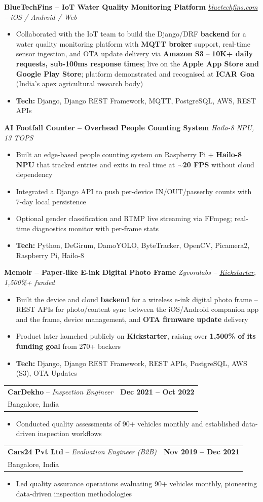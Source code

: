 \documentclass[letterpaper,10.5pt]{article}
\makeatletter
\newcommand{\resumeItem}[1]{
  \item\small{#1\vspace{1pt}}
}
\newcommand{\resumeRole}[4]{
  \vspace{-1pt}\item[]
    \begin{tabular*}{\textwidth}{l@{\extracolsep{\fill}}r}
      \textbf{#1} -- \textit{#3} & \textbf{#2}\\
      \small #4 &  \\
    \end{tabular*}\vspace{-4pt}
}
\newcommand{\bulletListStart}{\begin{itemize}[leftmargin=0.2in, itemsep=0pt, topsep=1pt]}
\newcommand{\bulletListEnd}{\end{itemize}\vspace{2pt}}
\newcommand{\projectEntry}[2]{
  \needspace{4\baselineskip}
  \vspace{4pt}
  {\small\textbf{#1}} \hfill {\small\textit{#2}}\\[-6pt]
}
\makeatother
\begin{document}
  \projectEntry{BlueTechFins -- IoT Water Quality Monitoring Platform}{\href{https://bluetechfins.com/}{bluetechfins.com} -- iOS / Android / Web}
  \bulletListStart
    \resumeItem{Collaborated with the IoT team to build the Django/DRF \textbf{backend} for a water quality monitoring platform with \textbf{MQTT broker} support, real-time sensor ingestion, and OTA update delivery via \textbf{Amazon S3} -- \textbf{10K+ daily requests, sub-100ms response times}; live on the \textbf{Apple App Store and Google Play Store}; platform demonstrated and recognised at \textbf{ICAR Goa} (India's apex agricultural research body)}
    \resumeItem{\textbf{Tech:} Django, Django REST Framework, MQTT, PostgreSQL, AWS, REST APIs}
  \bulletListEnd

  \projectEntry{AI Footfall Counter -- Overhead People Counting System}{Hailo-8 NPU, 13 TOPS}
  \bulletListStart
    \resumeItem{Built an edge-based people counting system on Raspberry Pi + \textbf{Hailo-8 NPU} that tracked entries and exits in real time at \textbf{$\sim$20 FPS} without cloud dependency}
    \resumeItem{Integrated a Django API to push per-device IN/OUT/passerby counts with 7-day local persistence}
    \resumeItem{Optional gender classification and RTMP live streaming via FFmpeg; real-time diagnostics monitor with per-frame stats}
    \resumeItem{\textbf{Tech:} Python, DeGirum, DamoYOLO, ByteTracker, OpenCV, Picamera2, Raspberry Pi, Hailo-8}
  \bulletListEnd

  \projectEntry{Memoir -- Paper-like E-ink Digital Photo Frame}{Zyvoralabs -- \href{https://www.kickstarter.com/projects/698611014/memoir-a-paper-like-e-ink-digital-frame}{Kickstarter}, 1,500\%+ funded}
  \bulletListStart
    \resumeItem{Built the device and cloud \textbf{backend} for a wireless e-ink digital photo frame -- REST APIs for photo/content sync between the iOS/Android companion app and the frame, device management, and \textbf{OTA firmware update} delivery}
    \resumeItem{Product later launched publicly on \textbf{Kickstarter}, raising over \textbf{1,500\% of its funding goal} from 270+ backers}
    \resumeItem{\textbf{Tech:} Django, Django REST Framework, REST APIs, PostgreSQL, AWS (S3), OTA Updates}
  \bulletListEnd

  \resumeRole
    {CarDekho}{Dec 2021 -- Oct 2022}
    {Inspection Engineer}{Bangalore, India}
  \bulletListStart
    \resumeItem{Conducted quality assessments of 90+ vehicles monthly and established data-driven inspection workflows}
  \bulletListEnd

  \resumeRole
    {Cars24 Pvt Ltd}{Nov 2019 -- Dec 2021}
    {Evaluation Engineer (B2B)}{Bangalore, India}
  \bulletListStart
    \resumeItem{Led quality assurance operations evaluating 90+ vehicles monthly, pioneering data-driven inspection methodologies}
  \bulletListEnd
\end{document}
